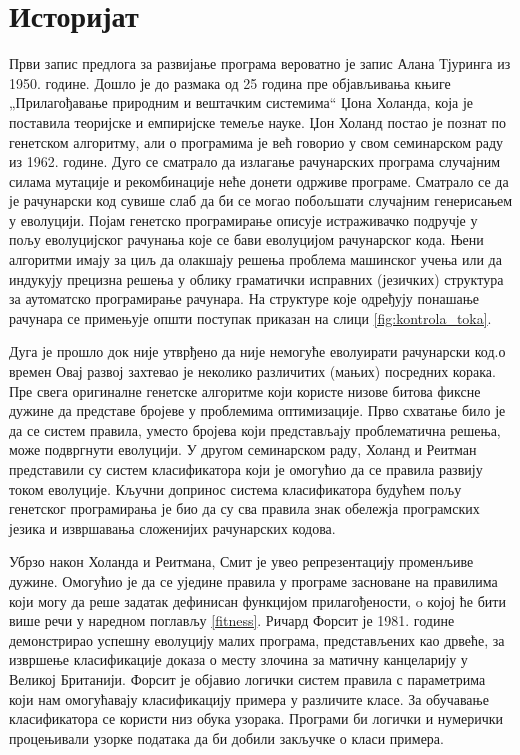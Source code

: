 \documentclass[a4paper]{article}
\begin{document}
\section{Историјат}
Први запис предлога за развијање програма вероватно је запис Алана Тјуринга из 1950. године. Дошло је до размака од 25 година пре објављивања књиге „Прилагођавање природним и вештачким системима“ Џона Холанда, која је поставила теоријске и емпиријске темеље науке.
Џон Холанд постао је познат по генетском алгоритму, али о програмима је већ говорио у свом семинарском раду из 1962. године. Дуго се сматрало да излагање рачунарских програма
случајним силама мутације и рекомбинације неће донети одрживе програме. Сматрало се да је рачунарски код сувише слаб да би се могао побољшати случајним генерисањем у еволуцији.
Појам генетско програмирање описује истраживачко подручје у пољу еволуцијског рачунања које се бави еволуцијом рачунарског кода. Њени алгоритми имају за циљ да олакшају решења проблема машинског учења или да индукују прецизна решења у облику граматички исправних (језичких) структура за аутоматско програмирање рачунара. На структуре које одређују понашање рачунара се примењује општи поступак приказан на слици \ref{fig:kontrola_toka}.


Дуга је прошло док није утврђено  да није немогуће еволуирати рачунарски код.о времен Овај развој захтевао је неколико различитих (мањих) посредних корака. Пре свега оригиналне генетске алгоритме који користе низове битова фиксне дужине да представе бројеве у проблемима оптимизације. Прво схватање било је да се систем правила, уместо бројева који представљају проблематична решења, може подвргнути еволуцији. У другом семинарском раду, Холанд и Реитман представили су систем класификатора који је омогућио да се правила развију током еволуције. Кључни допринос система класификатора будућем пољу генетског програмирања је био да су сва правила знак обележја програмских језика и извршавања сложенијих рачунарских кодова.


Убрзо након Холанда и Реитмана, Смит је увео репрезентацију променљиве дужине.  Омогућио је да се уједине правила у програме засноване на правилима који могу да реше задатак дефинисан функцијом прилагођености, o којој ће бити више речи у наредном поглављу \ref{fitness}. Ричард Форсит је 1981. године демонстрирао успешну еволуцију малих програма, представљених као дрвеће, за извршење класификације доказа о месту злочина за матичну канцеларију у Великој Британији. Форсит је објавио логички систем правила с параметрима који нам омогућавају класификацију примера у различите класе. За обучавање класификатора се користи низ обука узорака. Програми би логички и нумерички процењивали узорке података да би добили закључке о класи примера.\cite{genetic_algorithms}
\end{document}
